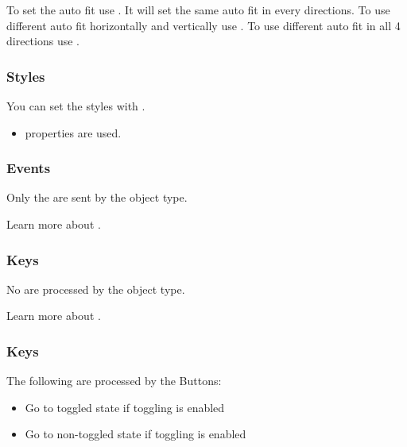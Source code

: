\documentclass[letterpaper,10pt,english]{sphinxmanual}
\begin{document}
To set the auto fit use . It will set the same auto fit in every directions.
To use different auto fit horizontally and vertically use .
To use different auto fit in all 4 directions use .


\subsubsection{Styles}
\label{\detokenize{object-types/cont:styles}}
You can set the styles with .
\begin{itemize}
\item {} 
 properties are used.

\end{itemize}


\subsubsection{Events}
\label{\detokenize{object-types/cont:events}}
Only the  are sent by the object type.

Learn more about {\hyperref[\detokenize{overview/events::doc}]{}}.


\subsubsection{Keys}
\label{\detokenize{object-types/cont:keys}}
No  are processed by the object type.

Learn more about {\hyperref[\detokenize{overview/indev::doc}]{}}.


\subsubsection{Keys}
\label{\detokenize{object-types/cont:id1}}
The following  are processed by the Buttons:
\begin{itemize}
\item {} 
 Go to toggled state if toggling is enabled

\item {} 
 Go to non-toggled state if toggling is  enabled

\end{itemize}
\end{document}
